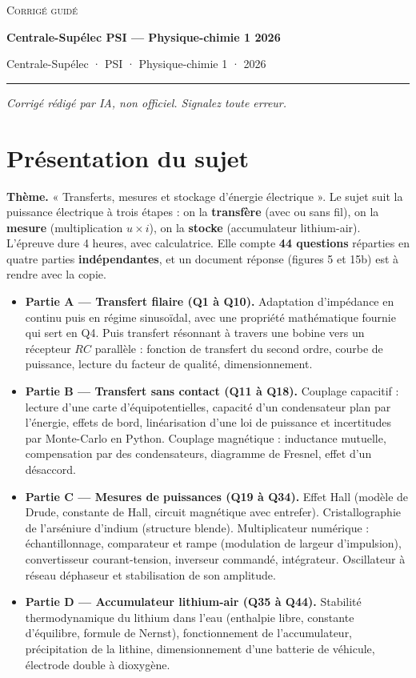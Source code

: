\documentclass[11pt,a4paper]{article}
\providecommand{\tightlist}{\setlength{\itemsep}{0pt}\setlength{\parskip}{0pt}}
\begin{document}
\thispagestyle{plain}
\begin{center}
  {\small\scshape Corrigé guidé}\par\smallskip
  {\LARGE\bfseries Centrale-Supélec PSI — Physique-chimie 1 2026\par}\medskip
  {\large Centrale-Supélec · PSI · Physique-chimie 1 · 2026\par}
\end{center}
\vspace{2pt}\hrule\vspace{8pt}

\emph{Corrigé rédigé par IA, non officiel. Signalez toute erreur.}

\hypertarget{pruxe9sentation-du-sujet}{%
\section{Présentation du sujet}\label{pruxe9sentation-du-sujet}}

\textbf{Thème.} « Transferts, mesures et stockage d'énergie électrique ». Le sujet suit la puissance électrique à trois étapes : on la \textbf{transfère} (avec ou sans fil), on la \textbf{mesure} (multiplication \(u\times i\)), on la \textbf{stocke} (accumulateur lithium-air). L'épreuve dure 4 heures, avec calculatrice. Elle compte \textbf{44 questions} réparties en quatre parties \textbf{indépendantes}, et un document réponse (figures 5 et 15b) est à rendre avec la copie.

\begin{itemize}
\tightlist
\item
  \textbf{Partie A --- Transfert filaire (Q1 à Q10).} Adaptation d'impédance en continu puis en régime sinusoïdal, avec une propriété mathématique fournie qui sert en Q4. Puis transfert résonnant à travers une bobine vers un récepteur \(RC\) parallèle : fonction de transfert du second ordre, courbe de puissance, lecture du facteur de qualité, dimensionnement.
\item
  \textbf{Partie B --- Transfert sans contact (Q11 à Q18).} Couplage capacitif : lecture d'une carte d'équipotentielles, capacité d'un condensateur plan par l'énergie, effets de bord, linéarisation d'une loi de puissance et incertitudes par Monte-Carlo en Python. Couplage magnétique : inductance mutuelle, compensation par des condensateurs, diagramme de Fresnel, effet d'un désaccord.
\item
  \textbf{Partie C --- Mesures de puissances (Q19 à Q34).} Effet Hall (modèle de Drude, constante de Hall, circuit magnétique avec entrefer). Cristallographie de l'arséniure d'indium (structure blende). Multiplicateur numérique : échantillonnage, comparateur et rampe (modulation de largeur d'impulsion), convertisseur courant-tension, inverseur commandé, intégrateur. Oscillateur à réseau déphaseur et stabilisation de son amplitude.
\item
  \textbf{Partie D --- Accumulateur lithium-air (Q35 à Q44).} Stabilité thermodynamique du lithium dans l'eau (enthalpie libre, constante d'équilibre, formule de Nernst), fonctionnement de l'accumulateur, précipitation de la lithine, dimensionnement d'une batterie de véhicule, électrode double à dioxygène.
\end{itemize}
\end{document}
